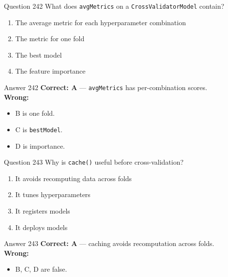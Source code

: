 \documentclass[aspectratio=169,11pt]{beamer}
\begin{document}
	\begin{frame}{Question 242}
		What does \texttt{avgMetrics} on a \texttt{CrossValidatorModel} contain?
		\begin{enumerate}[label=\Alph*.]
			\item The average metric for each hyperparameter combination
			\item The metric for one fold
			\item The best model
			\item The feature importance
		\end{enumerate}
	\end{frame}
	\begin{frame}{Answer 242}
		\textbf{Correct: A} --- \texttt{avgMetrics} has per-combination scores.\\
		\vspace{0.5em}
		\textbf{Wrong:}
		\begin{itemize}
			\item B is one fold.
			\item C is \texttt{bestModel}.
			\item D is importance.
		\end{itemize}
	\end{frame}
	
	\begin{frame}{Question 243}
		Why is \texttt{cache()} useful before cross-validation?
		\begin{enumerate}[label=\Alph*.]
			\item It avoids recomputing data across folds
			\item It tunes hyperparameters
			\item It registers models
			\item It deploys models
		\end{enumerate}
	\end{frame}
	\begin{frame}{Answer 243}
		\textbf{Correct: A} --- caching avoids recomputation across folds.\\
		\vspace{0.5em}
		\textbf{Wrong:}
		\begin{itemize}
			\item B, C, D are false.
		\end{itemize}
	\end{frame}
	
\end{document}
